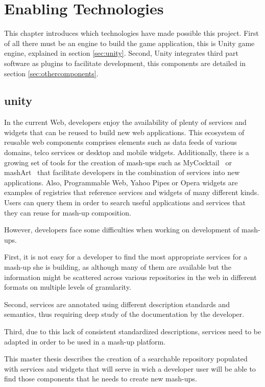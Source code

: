 
\chapter{Enabling Technologies}
\label{chap:enabling_technologies}
\begin{chapterintro}
This chapter introduces which technologies have made possible this project. First of all there must be an engine to build the game application, this is Unity game engine, explained in section \ref{sec:unity}. Second, Unity integrates third part software as plugins to facilitate development, this components are detailed in section \ref{sec:othercomponents}.
\end{chapterintro}

\cleardoublepage
\section{unity}
In the current Web, developers enjoy the availability of plenty of services and widgets that can be reused to build new web applications. This ecosystem of reusable web components comprises elements such as data feeds of various domains, telco services or desktop and mobile widgets. Additionally, there is a growing set of tools for the creation of mash-ups such as MyCocktail~\cite{iglesias2011combining} or mashArt~\cite{daniel2009hosted} that facilitate developers in the combination of services into new applications. Also, Programmable Web, Yahoo Pipes or Opera widgets are examples of registries that reference services and widgets of many different kinds. Users can query them in order to search useful applications and services that they can reuse for mash-up composition.

However, developers face some difficulties when working on development of mash-ups. 

First, it is not easy for a developer to find the most appropriate services for a mash-up she is building, as although many of them are available but the information might be scattered across various repositories in the web in different formats on multiple levels of granularity.

Second, services are annotated using different description standards and semantics, thus requiring deep study of the documentation by the developer.

Third, due to this lack of consistent standardized descriptions, services need to be adapted in order to be used in a mash-up platform. 

This master thesis describes the creation of a searchable repository populated with services and widgets that will serve in wich a developer user will be able to find those components that he needs to create new mash-ups.

